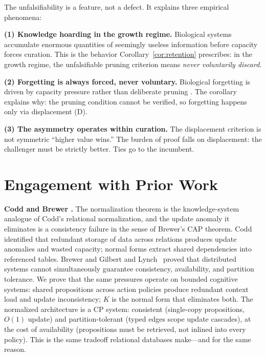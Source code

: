 \documentclass[11pt]{article}
\theoremstyle{definition}
\theoremstyle{remark}
\begin{document}
The unfalsifiability is a feature, not a defect. It explains three
empirical phenomena:

\textbf{(1) Knowledge hoarding in the growth regime.} Biological
systems accumulate enormous quantities of seemingly useless information
before capacity forces curation. This is the behavior
Corollary~\ref{cor:retention} prescribes: in the growth regime, the
unfalsifiable pruning criterion means \emph{never voluntarily discard}.

\textbf{(2) Forgetting is always forced, never voluntary.} Biological
forgetting is driven by capacity pressure rather than deliberate
pruning \cite{AndersonSchooler1991}. The corollary explains why:
the pruning condition cannot be verified, so forgetting happens only
via displacement (D).

\textbf{(3) The asymmetry operates within curation.} The displacement
criterion is not symmetric ``higher value wins.'' The burden of proof
falls on displacement: the challenger must be strictly better. Ties go
to the incumbent.

\section{Engagement with Prior Work}
\label{sec:discussion}

\textbf{Codd \cite{Codd1970} and Brewer \cite{Brewer2000}.}
The normalization theorem is the knowledge-system analogue of Codd's
relational normalization, and the update anomaly it eliminates is a
consistency failure in the sense of Brewer's CAP theorem.
Codd identified that redundant storage of data across relations produces
update anomalies and wasted capacity; normal forms extract shared
dependencies into referenced tables. Brewer and Gilbert and
Lynch~\cite{Gilbert2002} proved that distributed systems cannot
simultaneously guarantee consistency, availability, and partition
tolerance. We prove that the same pressures operate on bounded cognitive
systems: shared propositions across action policies produce redundant
context load and update inconsistency; $K$ is the normal form that
eliminates both. The normalized architecture is a CP system: consistent
(single-copy propositions, $O(1)$ update) and partition-tolerant (typed
edges scope update cascades), at the cost of availability (propositions
must be retrieved, not inlined into every policy). This is the same
tradeoff relational databases make---and for the same reason.
\end{document}
